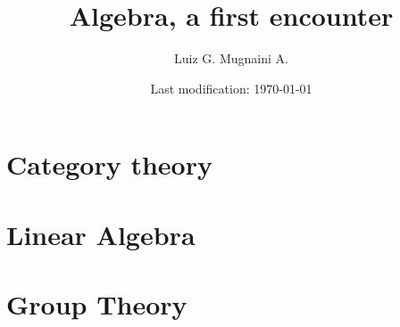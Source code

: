 

\title{Algebra, a first encounter}
\author{Luiz G. Mugnaini A.}
\date{Last modification: \today}


\maketitle
\tableofcontents
\listoftodos

\part{Category theory}



\part{Linear Algebra}



\part{Group Theory}


   

